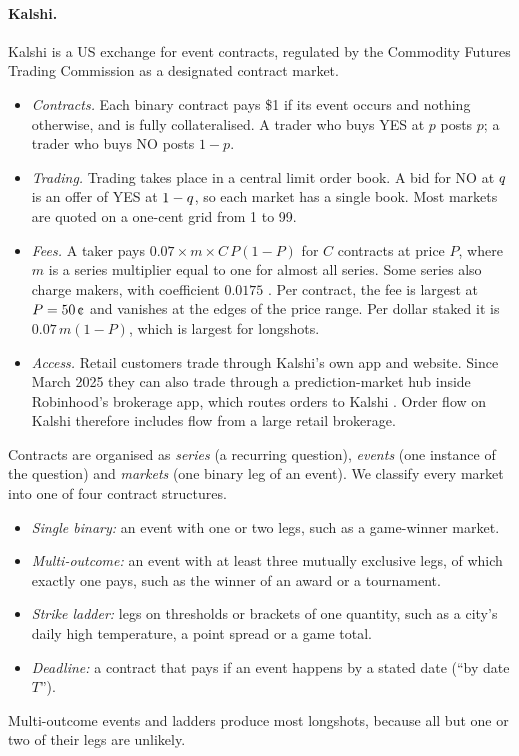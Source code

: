 \paragraph{Kalshi.} Kalshi is a US exchange for event contracts, regulated by the Commodity Futures
Trading Commission as a designated contract market.
\begin{itemize}
  \item \emph{Contracts.} Each binary contract pays \$1 if its event occurs and nothing otherwise,
  and is fully collateralised. A trader who buys YES at $p$ posts $p$; a trader who buys NO posts
  $1-p$.
  \item \emph{Trading.} Trading takes place in a central limit order book. A bid for NO at $q$ is an
  offer of YES at $1-q$, so each market has a single book. Most markets are quoted on a one-cent
  grid from 1 to 99\cents.
  \item \emph{Fees.} A taker pays $0.07\times m\times C\,P(1-P)$ for $C$ contracts at price $P$, where
  $m$ is a series multiplier equal to one for almost all series. Some series also charge makers,
  with coefficient $0.0175$ \citep{kalshifees}. Per contract, the fee is largest at
  $P=50\cents$ and vanishes at the edges of the price range. Per dollar staked it is
  $0.07\,m(1-P)$, which is largest for longshots.
  \item \emph{Access.} Retail customers trade through Kalshi's own app and website. Since March 2025
  they can also trade through a prediction-market hub inside Robinhood's brokerage app, which routes
  orders to Kalshi \citep{robinhood2025}. Order flow on Kalshi therefore includes flow from a large
  retail brokerage.
\end{itemize}
Contracts are organised as \emph{series} (a recurring question), \emph{events} (one instance of
the question) and \emph{markets} (one binary leg of an event). We classify every market into one of
four contract structures.
\begin{itemize}
  \item \emph{Single binary:} an event with one or two legs, such as a game-winner market.
  \item \emph{Multi-outcome:} an event with at least three mutually exclusive legs, of which
  exactly one pays, such as the winner of an award or a tournament.
  \item \emph{Strike ladder:} legs on thresholds or brackets of one quantity, such as a city's
  daily high temperature, a point spread or a game total.
  \item \emph{Deadline:} a contract that pays if an event happens by a stated date
  (``by date $T$'').
\end{itemize}
Multi-outcome events and ladders produce most longshots, because all but one or two of their legs
are unlikely.

